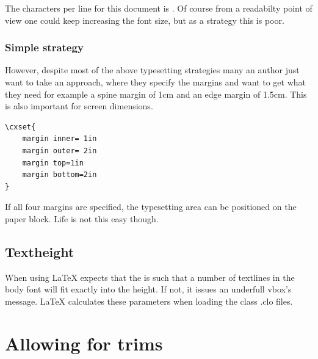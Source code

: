 The characters per line for this document is \charactersperline. Of course from a readabilty point of view one could keep increasing the font size, but as a strategy this is poor. 

\subsubsection{Simple strategy}
However, despite most of the above typesetting strategies many an author just want to take an approach, where they specify the margins and want to get what they need for example a spine margin of 1cm and an edge margin of 1.5cm. This is also important for screen dimensions.

\begin{lstlisting}
\cxset{
    margin inner= 1in
    margin outer= 2in
    margin top=1in
    margin bottom=2in
}
\end{lstlisting}

If all four margins are specified, the typesetting area can be positioned on the paper block. Life is not this easy though.



\subsection{Textheight}

When using  LaTeX expects that the  is such that a number of textlines in the body font will fit exactly into the height. If not, it issues an underfull vbox's message. LaTeX calculates these parameters when loading the class .clo files.
 



\section{Allowing for trims}
\newpage

\reversemarginparfalse

